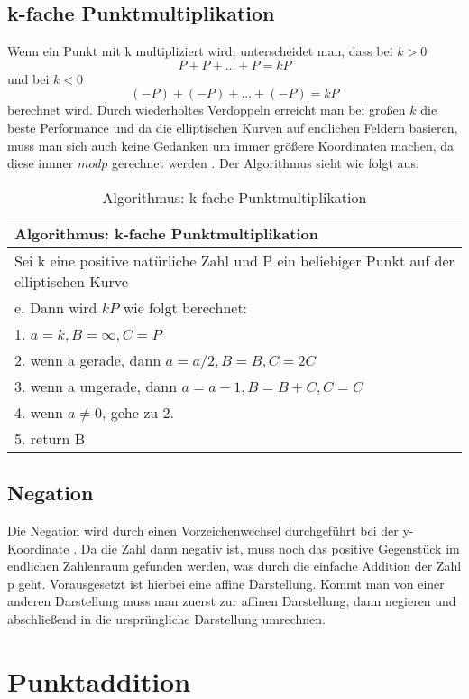 \subsection{k-fache Punktmultiplikation}
Wenn ein Punkt mit k multipliziert wird, unterscheidet man, dass bei \(k > 0\) \[P + P + ... + P = kP\] und bei \(k < 0\) \[ (-P) + (-P) + ... + (-P) = kP\] berechnet wird. Durch wiederholtes Verdoppeln erreicht man bei großen \(k\) die beste Performance und da die elliptischen Kurven auf endlichen Feldern basieren, muss man sich auch keine Gedanken um immer größere Koordinaten machen, da diese immer \( mod p\) gerechnet werden \cite{Washington2003}. Der Algorithmus sieht wie folgt aus:

\begin{table}[!ht]
\centering
	\begin{tabular}{l}
		\toprule
		\textbf{Algorithmus: k-fache Punktmultiplikation}\\
		\midrule
		Sei k eine positive natürliche Zahl und P ein beliebiger Punkt auf der elliptischen Kurve\\ e. Dann wird \(kP\) wie folgt berechnet:\\
		1. \(a = k , B = \infty , C = P\)\\
		2. wenn a gerade, dann \(a = a/2 , B = B , C = 2C\)\\
		3. wenn a ungerade, dann \(a = a - 1 , B = B + C , C = C\)\\
		4. wenn \( a \neq 0\), gehe zu 2.\\
		5. return B\\
	   \bottomrule
	\end{tabular}
	\caption{Algorithmus: k-fache Punktmultiplikation \cite{Washington2003}}
	\label{tab6}
\end{table}


\subsection{Negation}
Die Negation wird durch einen Vorzeichenwechsel durchgeführt bei der y-Koordinate \cite{Washington2003}. Da die Zahl dann negativ ist, muss noch das positive Gegenstück im endlichen Zahlenraum gefunden werden, was durch die einfache Addition der Zahl p geht. Vorausgesetzt ist hierbei eine affine Darstellung. Kommt man von einer anderen Darstellung muss man zuerst zur affinen Darstellung, dann negieren und abschließend in die ursprüngliche Darstellung umrechnen.
\newpage
\section{Punktaddition}
